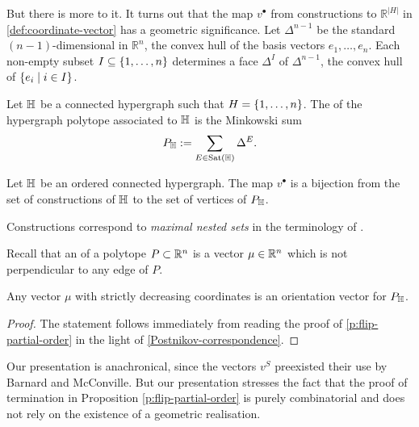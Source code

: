 But there is more to it. 
It turns out that the map $v^{\bullet}$ from constructions to $\mathbb{R}^{|H|}$
in \cref{def:coordinate-vector} has a geometric significance.  
Let $\Delta^{n-1}$ be the standard $(n-1)$-dimensional  in $\mathbb{R}^n$, the convex hull of the basis vectors $e_1,\ldots,e_n$. 
Each non-empty subset $I \subseteq \left\{1,\ldots,n\right\}$ determines a face $\Delta^I$ of $\Delta^{n-1}$, the convex hull of $\left\{e_i \mid i\in I\right\}$. 

\begin{definition}
  Let ${\mathbb H}$ be a connected hypergraph such that $H=\left\{1,\ldots,n\right\}$. 
  The  of the hypergraph polytope associated to ${\mathbb H}$ is the Minkowski sum
  $$P_{{\mathbb H}}:=\sum_{E\in{\operatorname{Sat}}({\mathbb H})} \Delta^E.$$
\end{definition}

\begin{proposition}[{\cite[Prop.~7.9]{P09}}] 
  \label{Postnikov-correspondence}
  Let ${\mathbb H}$ be an ordered connected hypergraph.
  The map $v^{\bullet}$ is a bijection from the set of constructions of ${\mathbb H}$ to the set of vertices of $P_{{\mathbb H}}$.
\end{proposition}

\begin{rem}
  Constructions correspond to \emph{maximal nested sets} in the terminology of \cite{P09}.
\end{rem}

Recall that an  of a polytope $P\subset \mathbb R^n$ is a vector $\mu \in \mathbb R^n$ which is not perpendicular to any edge of $P$. 

\begin{corollary} 
  \label{Tamari-orientation-vector}
  Any vector $\mu$ with strictly decreasing coordinates is an orientation vector for $P_{{\mathbb H}}$.
\end{corollary} 

\begin{proof}
The statement follows immediately from reading the proof of \cref{p:flip-partial-order} in the light of \cref{Postnikov-correspondence}.
\end{proof}

\begin{rem} 
  Our presentation is anachronical, since the vectors $v^S$ preexisted their use by Barnard and McConville. 
  But our presentation stresses the fact that the proof of termination in Proposition \ref{p:flip-partial-order} is purely combinatorial and does not rely on the existence of a geometric realisation.
\end{rem}

